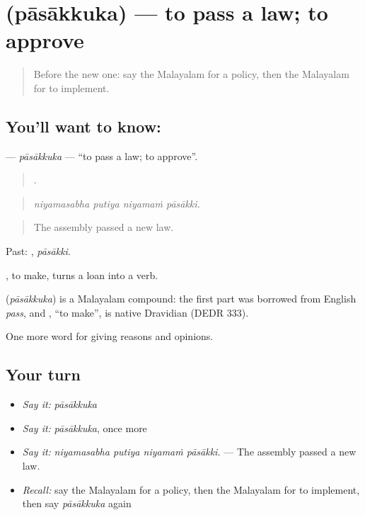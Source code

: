 \section[\texorpdfstring{\ml{പാസാക്കുക} (pāsākkuka)}{പാസാക്കുക (pāsākkuka)}]{ (pāsākkuka) — to pass a law; to approve}

\label{lesson:ML-C423-pasakkuka}



\begin{quote}
Before the new one: say the Malayalam for a policy, then the Malayalam for to implement.
\end{quote}

\subsection*{You'll want to know: }
\textbf{} — \emph{pāsākkuka} — \textquotedblleft{}to pass a law; to approve\textquotedblright{}.

\begin{quote}
   .
\end{quote}

\begin{quote}
\emph{niyamasabha putiya niyamaṁ pāsākki.}
\end{quote}

\begin{quote}
The assembly passed a new law.
\end{quote}

Past: , \emph{pāsākki}.

, to make, turns a loan into a verb.

\begin{cousinweb}
\textbf{} (\emph{pāsākkuka}) is a Malayalam compound: the first part was borrowed from English \emph{pass}, and , \textquotedblleft{}to make\textquotedblright{}, is native Dravidian (DEDR 333).
\end{cousinweb}

\begin{grammarlens}[title={What you've built}]
One more word for giving reasons and opinions.
\end{grammarlens}

\subsection*{Your turn}
\begin{itemize}
\raggedright
  \item \emph{Say it:} \emph{pāsākkuka}
  \item \emph{Say it:} \emph{pāsākkuka}, once more
  \item \emph{Say it:} \emph{niyamasabha putiya niyamaṁ pāsākki.} — The assembly passed a new law.
  \item \emph{Recall:} say the Malayalam for a policy, then the Malayalam for to implement, then say \emph{pāsākkuka} again
\end{itemize}

